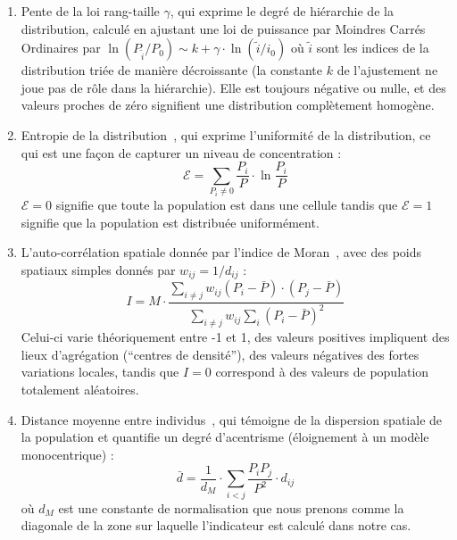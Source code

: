 {\begin{enumerate}
\item Pente de la loi rang-taille $\gamma$, qui exprime le degré de hiérarchie de la distribution, calculé en ajustant une loi de puissance par Moindres Carrés Ordinaires par $\ln \left( P_{\tilde{i}}/P_0\right) \sim k + \gamma\cdot \ln \left(\tilde{i}/i_0\right)$ où $\tilde{i}$ sont les indices de la distribution triée de manière décroissante (la constante $k$ de l'ajustement ne joue pas de rôle dans la hiérarchie). Elle est toujours négative ou nulle, et des valeurs proches de zéro signifient une distribution complètement homogène. %
\item Entropie de la distribution~\cite{le2015forme}, qui exprime l'uniformité de la distribution, ce qui est une façon de capturer un niveau de concentration :
\begin{equation}
\mathcal{E} = \sum_{P_i\neq 0}\frac{P_i}{P}\cdot \ln{\frac{P_i}{P}}
\end{equation}
$\mathcal{E}=0$ signifie que toute la population est dans une cellule tandis que $\mathcal{E}=1$ signifie que la population est distribuée uniformément.
\item L'auto-corrélation spatiale donnée par l'indice de Moran~\cite{tsai2005quantifying}, avec des poids spatiaux simples donnés par $w_{ij} = 1/d_{ij}$ :
\[
I = M \cdot \frac{\sum_{i\neq j} w_{ij} \left(P_i - \bar{P}\right)\cdot\left(P_j - \bar{P}\right)}{\sum_{i\neq j} w_{ij} \sum_{i}{\left( P_i - \bar{P}\right)}^2}
\]
Celui-ci varie théoriquement entre -1 et 1, des valeurs positives impliquent des lieux d'agrégation (``centres de densité''), des valeurs négatives des fortes variations locales, tandis que $I=0$ correspond à des valeurs de population totalement aléatoires.
\item Distance moyenne entre individus~\cite{le2009quantifier}, qui témoigne de la dispersion spatiale de la population et quantifie un degré d'acentrisme (éloignement à un modèle monocentrique) :
\[
\bar{d} = \frac{1}{d_M}\cdot \sum_{i<j} \frac{P_i P_j}{P^2} \cdot d_{ij}
\]
où $d_M$ est une constante de normalisation que nous prenons comme la diagonale de la zone sur laquelle l'indicateur est calculé dans notre cas.
\end{enumerate}
}



